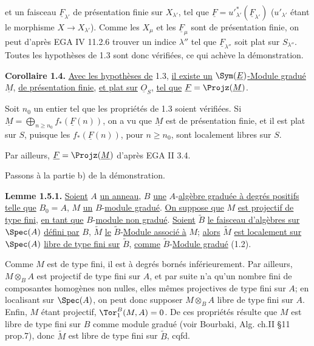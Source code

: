 
et un faisceau \(\underline{F}_{\lambda'}\) de présentation finie sur \(X_{\lambda'}\), tel que \(\underline{F}=u'^*_{\lambda'}(\underline{F}_{\lambda'})\) (\(u'_{\lambda'}\) étant le morphisme \(X\to X_{\lambda'}\)). Comme les \(X_\mu\) et les \(\underline{F}_\mu\) sont de présentation finie, on peut d'après EGA IV 11.2.6 trouver un indice \(\lambda''\) tel que \(\underline{F}_{\lambda''}\) soit plat sur \(S_{\lambda''}\). Toutes les hypothèses de 1.3 sont donc vérifiées, ce qui achève la démonstration.

\textbf{Corollaire 1.4.} \uline{Avec les hypothèses de} 1.3, \uline{il existe un} \(\Sym(\underline{E})\)\uline{-Module gradué} \(\underline{M}\), \uline{de présentation finie}, \uline{et plat sur} \(\underline{O}_S\), \uline{tel que} \(\underline{F}=\Projz(\underline{M})\).

Soit \(n_0\) un entier tel que les propriétés de 1.3 soient vérifiées. Si \(\underline{M}=\bigoplus_{n\geq n_0} f_*(\underline{F}(n))\), on a vu que \(\underline{M}\) est de présentation finie, et il est plat sur \(S\), puisque les \(f_*(\underline{F}(n))\), pour \(n\geq n_0\), sont localement libres sur \(S\).

Par ailleurs, \(\underline{F}=\Projz(\underline{M})\) d'après EGA II 3.4.

Passons à la partie b) de la démonstration.

\textbf{Lemme 1.5.1.} \uline{Soient} \(A\) \uline{un anneau}, \(B\) \uline{une} \(A\)-\uline{algèbre graduée à degrés positifs} \uline{telle que} \(B_0=A\), \(M\) \uline{un} \(B\)-\uline{module gradué}. \uline{On suppose que} \(M\) \uline{est projectif de type fini}, \uline{en tant que} \(B\)-\uline{module non gradué}. \uline{Soient} \(\widetilde B\) \uline{le faisceau d'algèbres sur} \(\Spec(A)\) \uline{défini par} \(B\), \(\widetilde M\) \uline{le} \(\widetilde B\)-\uline{Module associé à} \(M\); \uline{alors} \(\widetilde M\) \uline{est localement sur} \(\Spec(A)\) \uline{libre de type fini sur} \(\widetilde B\), \uline{comme} \(\widetilde B\)-\uline{Module gradué} (1.2).

Comme \(M\) est de type fini, il est à degrés bornés inférieurement. Par ailleurs, \(M\otimes_B A\) est projectif de type fini sur \(A\), et par suite n'a qu'un nombre fini de composantes homogènes non nulles, elles mêmes projectives de type fini sur \(A\); en localisant sur \(\Spec(A)\), on peut donc supposer \(M\otimes_B A\) libre de type fini sur \(A\). Enfin, \(M\) étant projectif, \(\Tor_1^B(M,A)=0\). De ces propriétés résulte que \(M\) est libre de type fini sur \(B\) comme module gradué (voir Bourbaki, Alg. ch.II §11 prop.7), donc \(\widetilde M\) est libre de type fini sur \(\widetilde B\), cqfd.

